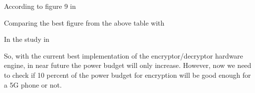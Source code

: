 According to figure 9 in %


Comparing the best figure from the above table with %


In the study in %

So, with the current best implementation of the encryptor/decryptor hardware engine, in near future the power budget will only increase. However, now we need to check if 10 percent of the power budget for encryption will be good enough for a 5G phone or not.





